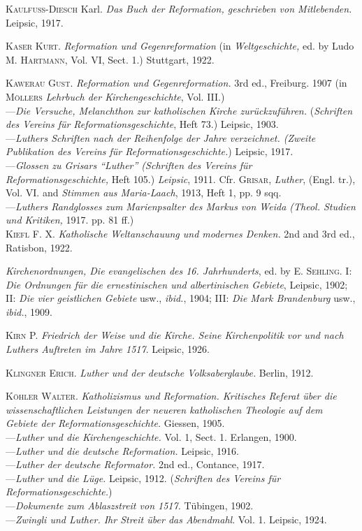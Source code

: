 \textsc{Kaulfuss-Diesch} Karl. \textit{Das Buch der Reformation, geschrieben von Mitlebenden.}
Leipsic, 1917.

\textsc{Kaser Kurt.} \textit{Reformation und Gegenreformation} (in \textit{Weltgeschichte,} ed.
by Ludo \textsc{M. Hartmann}, Vol. VI, Sect. 1.) Stuttgart, 1922.

\textsc{Kawerau Gust.} \textit{Reformation und Gegenreformation.} 3rd ed., Freiburg. 1907
(in \textsc{Möllers} \textit{Lehrbuch der Kirchengeschichte}, Vol. III.) \\
---\textit{Die Versuche, Melanchthon zur katholischen Kirche zurückzuführen.}
(\textit{Schriften des Vereins für Reformationsgeschichte}, Heft 73.) Leipsic,
1903. \\
---\textit{Luthers Schriften nach der Reihenfolge der Jahre verzeichnet. (Zweite
Publikation des Vereins für Reformationsgeschichte.}) Leipsic, 1917. \\
---\textit{Glossen zu Grisars “Luther” (Schriften des Vereins für Reformationsgeschichte,}
Heft 105.) \textit{Leipsic}, 1911. Cfr. \textsc{Grisar}, \textit{Luther}, (Engl. tr.), Vol.
VI. and \textit{Stimmen aus Maria-Laach}, 1913, Heft 1, pp. 9 sqq. \\
---\textit{Luthers Randglosses zum Marienpsalter des Markus von Weida (Theol.
Studien und Kritiken,} 1917. pp. 81 ff.) \\

\textsc{Kiefl F. X.} \textit{Katholische Weltanschauung und modernes Denken.} 2nd and
3rd ed., Ratisbon, 1922.

\textit{Kirchenordnungen, Die evangelischen des 16. Jahrhunderts}, ed. by \textsc{E. Sehling.}
I: \textit{Die Ordnungen für die ernestinischen und albertinischen Gebiete}, Leipsic, 1902;
II: \textit{Die vier geistlichen Gebiete} usw., \textit{ibid.}, 1904;
III: \textit{Die Mark Brandenburg} usw., \textit{ibid.}, 1909.

\textsc{Kirn P.} \textit{Friedrich der Weise und die Kirche. Seine Kirchenpolitik vor und
nach Luthers Auftreten im Jahre 1517}. Leipsic, 1926.

\textsc{Klingner Erich.} \textit{Luther und der deutsche Volksaberglaube.} Berlin, 1912.

\textsc{Köhler Walter}. \textit{Katholizismus und Reformation. Kritisches Referat über
die wissenschaftlichen Leistungen der neueren katholischen Theologie auf
dem Gebiete der Reformationsgeschichte.} Giessen, 1905. \\
---\textit{Luther und die Kirchengeschichte.} Vol. 1, Sect. 1. Erlangen, 1900. \\
---\textit{Luther und die deutsche Reformation.} Leipsic, 1916. \\
---\textit{Luther der deutsche Reformator.} 2nd ed., Contance, 1917. \\
---\textit{Luther und die Lüge.} Leipsic, 1912. (\textit{Schriften des Vereins für Reformationsgeschichte.}) \\
---\textit{Dokumente zum Ablaszstreit von 1517.} Tübingen, 1902. \\
---\textit{Zwingli und Luther. Ihr Streit über das Abendmahl}. Vol. 1. Leipsic,
1924. \\


